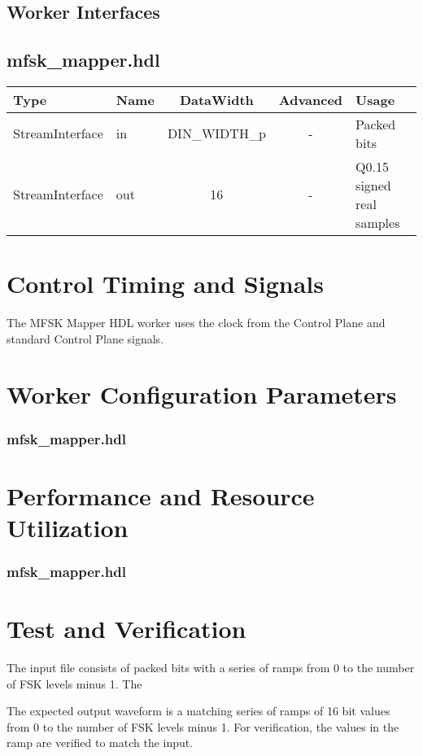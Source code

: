 \documentclass{article}
\def\comp{mfsk\_mapper}
\edef\ecomp{mfsk_mapper}
\def\Comp{MFSK Mapper}
\begin{document}
\begin{landscape}
	\section*{Worker Interfaces}
	\subsection*{\comp.hdl}
	\begin{scriptsize}
		\begin{tabular}{|M{2cm}|M{1.5cm}|c|c|p{12cm}|}
			\hline
			Type            & Name & DataWidth 		& Advanced  & Usage                 		\\
			\hline
			StreamInterface & in   & DIN\_WIDTH\_p	& - 		& Packed bits					\\
			\hline
			StreamInterface & out  & 16        		& -			& Q0.15 signed real samples 	\\
			\hline
		\end{tabular}
	\end{scriptsize}
\end{landscape}

\section*{Control Timing and Signals}
\begin{flushleft}
	The \Comp{} HDL worker uses the clock from the Control Plane and standard Control Plane signals.\\
\end{flushleft}

\begin{landscape}
\section*{Worker Configuration Parameters}
\subsubsection*{\comp.hdl}
%
\section*{Performance and Resource Utilization}
\subsubsection*{\comp.hdl}
%
\end{landscape}
\section*{Test and Verification}
\begin{flushleft}
	The input file consists of packed bits with a series of ramps from 0 to the number of FSK levels minus 1. The \medskip

	The expected output waveform is a matching series of ramps of 16 bit values from 0 to the number of FSK levels minus 1. For verification, the values in the ramp are verified to match the input.
\end{flushleft}
\end{document}
